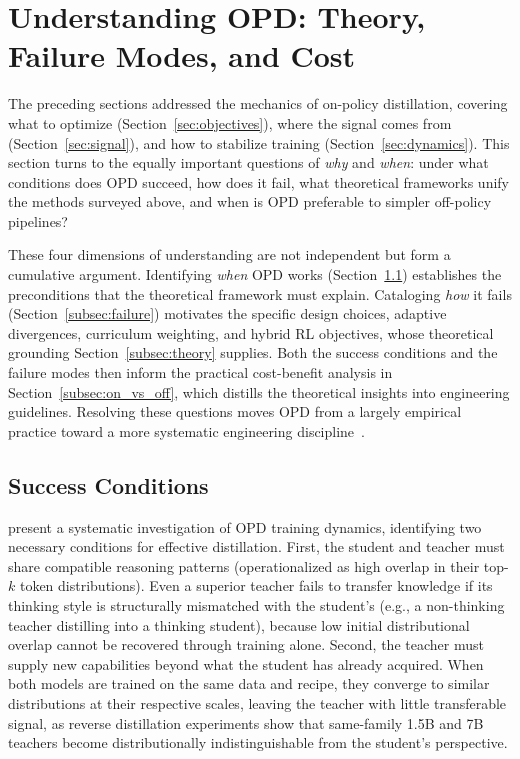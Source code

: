 \documentclass{article} %
\begin{document}
\section{Understanding OPD: Theory, Failure Modes, and Cost}
\label{sec:understanding}

The preceding sections addressed the mechanics of on-policy distillation, covering what to optimize (Section~\ref{sec:objectives}), where the signal comes from (Section~\ref{sec:signal}), and how to stabilize training (Section~\ref{sec:dynamics}). This section turns to the equally important questions of \emph{why} and \emph{when}: under what conditions does OPD succeed, how does it fail, what theoretical frameworks unify the methods surveyed above, and when is OPD preferable to simpler off-policy pipelines?

These four dimensions of understanding are not independent but form a cumulative argument. Identifying \emph{when} OPD works (Section~\ref{subsec:success}) establishes the preconditions that the theoretical framework must explain. Cataloging \emph{how} it fails (Section~\ref{subsec:failure}) motivates the specific design choices, adaptive divergences, curriculum weighting, and hybrid RL objectives, whose theoretical grounding Section~\ref{subsec:theory} supplies. Both the success conditions and the failure modes then inform the practical cost-benefit analysis in Section~\ref{subsec:on_vs_off}, which distills the theoretical insights into engineering guidelines. Resolving these questions moves OPD from a largely empirical practice toward a more systematic engineering discipline~\citep{2602.12222,2604.13016}.

\subsection{Success Conditions}
\label{subsec:success}

\citet{2604.13016} present a systematic investigation of OPD training dynamics, identifying two necessary conditions for effective distillation. First, the student and teacher must share compatible reasoning patterns (operationalized as high overlap in their top-$k$ token distributions). Even a superior teacher fails to transfer knowledge if its thinking style is structurally mismatched with the student's (e.g., a non-thinking teacher distilling into a thinking student), because low initial distributional overlap cannot be recovered through training alone. Second, the teacher must supply new capabilities beyond what the student has already acquired. When both models are trained on the same data and recipe, they converge to similar distributions at their respective scales, leaving the teacher with little transferable signal, as reverse distillation experiments show that same-family 1.5B and 7B teachers become distributionally indistinguishable from the student's perspective.
\end{document}
